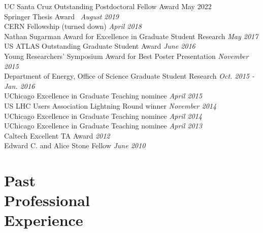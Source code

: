 \documentclass[margin,line]{resume}
\let\origsection\section%
\let\section\subsection%
\let\section\origsection%
\begin{document}
\begin{resume}
UC Santa Cruz Outstanding Postdoctoral Fellow Award \hfill{May 2022}\\
Springer Thesis Award~\cite{Stark2020} \hfill \textsl{August 2019}\\
CERN Fellowship (turned down) \hfill \textsl{April 2018}\\
Nathan Sugarman Award for Excellence in Graduate Student Research \hfill \textsl{May 2017}\\
US ATLAS Outstanding Graduate Student Award \hfill \textsl{June 2016}\\
Young Researchers' Symposium Award for Best Poster Presentation \hfill \textsl{November 2015}\\
Department of Energy, Office of Science Graduate Student Research \hfill \textsl{Oct. 2015 - Jan. 2016}\\
UChicago Excellence in Graduate Teaching nominee \hfill \textsl{April 2015}\\
US LHC Users Association Lightning Round winner \hfill \textsl{November 2014}\\
UChicago Excellence in Graduate Teaching nominee \hfill \textsl{April 2014}\\
UChicago Excellence in Graduate Teaching nominee \hfill \textsl{April 2013}\\
Caltech Excellent TA Award \hfill \textsl{2012}\\
Edward C. and Alice Stone Fellow \hfill \textsl{June 2010}


\section{\mysidestyle Past\\Professional\\Experience}


\end{resume}
\end{document}
